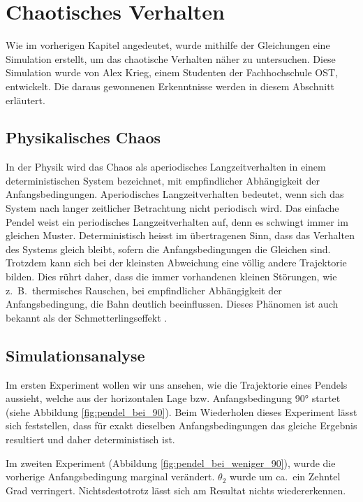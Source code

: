 \section{Chaotisches Verhalten}
Wie im vorherigen Kapitel angedeutet, wurde mithilfe der Gleichungen eine Simulation erstellt,
um das chaotische Verhalten näher zu untersuchen.
Diese Simulation wurde von Alex Krieg, einem Studenten der Fachhochschule OST, entwickelt.
Die daraus gewonnenen Erkenntnisse werden in diesem Abschnitt erläutert.


\subsection{Physikalisches Chaos}
In der Physik wird das Chaos als aperiodisches Langzeitverhalten in einem deterministischen
System bezeichnet, mit empfindlicher Abhängigkeit der Anfangsbedingungen.
Aperiodisches Langzeitverhalten bedeutet, wenn sich das System nach langer zeitlicher Betrachtung
nicht periodisch wird.
Das einfache Pendel weist ein periodisches Langzeitverhalten auf,
denn es schwingt immer im gleichen Muster.
Deterministisch heisst im übertragenen Sinn, dass das Verhalten des Systems gleich bleibt,
sofern die Anfangsbedingungen die Gleichen sind.
Trotzdem kann sich bei der kleinsten Abweichung eine völlig andere Trajektorie bilden.
Dies rührt daher, dass die immer vorhandenen kleinen Störungen, wie z.~B.~thermisches Rauschen,
bei empfindlicher Abhängigkeit der Anfangsbedingung, die Bahn deutlich beeinflussen.
Dieses Phänomen ist auch bekannt als der Schmetterlingseffekt \cite{doppelpendel:schmetterlingseffekt}.

\subsection{Simulationsanalyse}
Im ersten Experiment wollen wir uns ansehen, wie die Trajektorie eines Pendels aussieht,
welche aus der horizontalen Lage bzw. Anfangsbedingung 90° startet
(siehe Abbildung \ref{fig:pendel_bei_90}).
Beim Wiederholen dieses Experiment lässt sich feststellen, dass für exakt dieselben Anfangsbedingungen
das gleiche Ergebnis resultiert und daher deterministisch ist.

Im zweiten Experiment (Abbildung \ref{fig:pendel_bei_weniger_90}), wurde die vorherige
Anfangsbedingung marginal verändert.
\(\theta_2\) wurde um ca.~ein Zehntel Grad verringert.
Nichtsdestotrotz lässt sich am Resultat nichts wiedererkennen.

